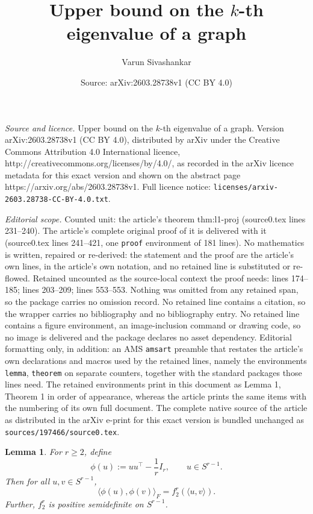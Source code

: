 \documentclass[10pt,a4paper]{amsart}
\title{Upper bound on the $k$-th eigenvalue of a graph}
\author{Varun Sivashankar}
\date{Source: arXiv:2603.28738v1 (CC BY 4.0)}
\newtheorem{lemma}{Lemma}
\newcommand{\froinner}[2]{\langle #1,#2\rangle_{\!F}}
\newcommand{\inner}[2]{\langle #1,#2\rangle}
\begin{document}
\maketitle

\noindent\emph{Source and licence.} Upper bound on the $k$-th eigenvalue of a graph. Version arXiv:2603.28738v1 (CC BY 4.0), distributed by arXiv under the Creative Commons Attribution 4.0 International licence, http://creativecommons.org/licenses/by/4.0/, as recorded in the arXiv licence metadata for this exact version and shown on the abstract page https://arxiv.org/abs/2603.28738v1. Full licence notice: \texttt{licenses/arxiv-2603.28738-CC-BY-4.0.txt}.\par\smallskip

\noindent\textit{Editorial scope.} Counted unit: the article's theorem thm:l1-proj (source0.tex lines 231--240). The article's complete original proof of it is delivered with it (source0.tex lines 241--421, one \texttt{proof} environment of 181 lines). No mathematics is written, repaired or re-derived: the statement and the proof are the article's own lines, in the article's own notation, and no retained line is substituted or re-flowed.  Retained uncounted as the source-local context the proof needs: lines 174--185; lines 203--209; lines 553--553.  Nothing was omitted from any retained span, so the package carries no omission record.  No retained line contains a citation, so the wrapper carries no bibliography and no bibliography entry.  No retained line contains a figure environment, an image-inclusion command or drawing code, so no image is delivered and the package declares no asset dependency.  Editorial formatting only, in addition: an AMS \texttt{amsart} preamble that restates the article's own declarations and macros used by the retained lines, namely the environments \texttt{lemma}, \texttt{theorem} on separate counters, together with the standard packages those lines need.  The retained environments print in this document as Lemma 1, Theorem 1 in order of appearance, whereas the article prints the same items with the numbering of its own full document.  The complete native source of the article as distributed in the arXiv e-print for this exact version is bundled unchanged as \texttt{sources/197466/source0.tex}.
\begin{lemma}\label{lem:psd2}
For $r \geq 2$, define
\[
\phi(u):=uu^\top-\frac1r I_r,
\qquad u\in S^{r-1}.
\]
Then for all $u,v\in S^{r-1}$,
\[
\froinner{\phi(u)}{\phi(v)}=f_2^r(\inner{u}{v}).
\]
Further, $f_2^r$ is positive semidefinite on $S^{r-1}$.
\end{lemma}
\end{document}
